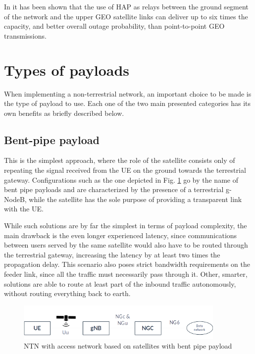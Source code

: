 In \cite{potential-multilayered-nierarchical-ntn-wang} it has been shown that the use of \ac{HAP} as relays between the ground segment of the network and the upper \ac{GEO} satellite links can deliver up to six times the capacity, and better overall outage probability, than point-to-point \ac{GEO} transmissions.


\section{Types of payloads}
When implementing a non-terrestrial network, an important choice to be made is the type of payload to use. Each one of the two main presented categories has its own benefits as briefly described below.

\subsection{Bent-pipe payload}
\label{sec:bent-pipe-payload}
This is the simplest approach, where the role of the satellite consists only of  repeating the signal received from the \ac{UE} on the ground towards the terrestrial gateway. Configurations such as the one depicted in Fig. \ref{fig:ntn-bent-pipe} go by the name of bent pipe payloads and are characterized by the presence of a terrestrial g-NodeB, while the satellite has the sole purpose of providing a transparent link with the \ac{UE}.

While such solutions are by far the simplest in terms of payload complexity, the main drawback is the even longer experienced latency, since communications between users served by the same satellite would also have to be routed through the terrestrial gateway, increasing the latency by at least two times the propagation delay.
This scenario also poses strict bandwidth requirements on the feeder link, since all the traffic must necessarily pass through it.
Other, smarter, solutions are able to route at least part of the inbound traffic autonomously, without routing everything back to earth.

\begin{figure}[ht]
    \centering
    \includegraphics[width=0.9\textwidth]{res/ntn-bent-pipe.png}
    \caption{NTN with access network based on satellites with bent pipe payload \cite{3gpp-tr-38.811}}
    \label{fig:ntn-bent-pipe}
\end{figure}

